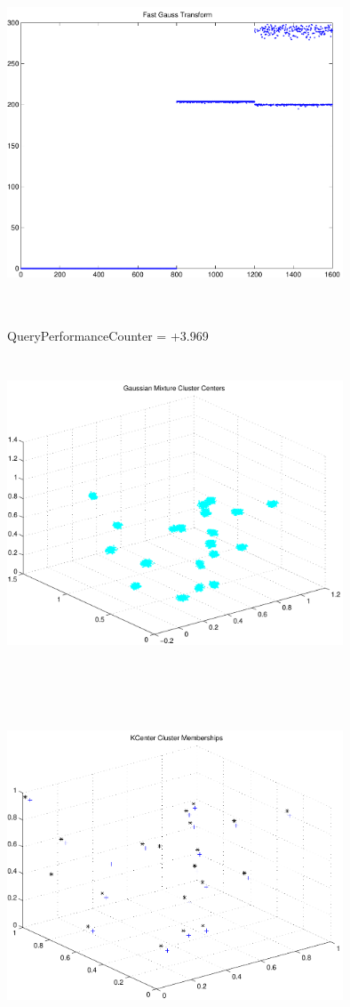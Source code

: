 \documentclass[9pt]{article}
\theoremstyle{plain}
\theoremstyle{definition}
\theoremstyle{remark}
\numberwithin{equation}{section}
\begin{document}
\includegraphics[width=10.0cm,height=10.0cm]{FGT4_Centers.pdf}

QueryPerformanceCounter  =  +3.969
\includegraphics[width=10.0cm,height=10.0cm]{GaussianMixture_ClusterCenters20_Centers.pdf}

\includegraphics[width=10.0cm,height=10.0cm]{KCenterClusterMemberships_20_Centers.pdf}
\end{document}

